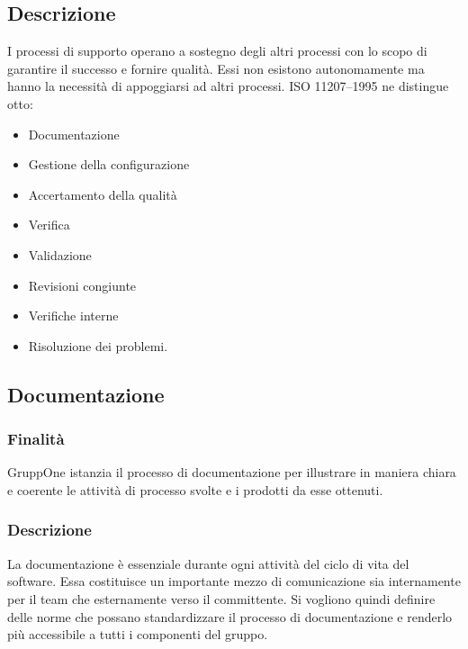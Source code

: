 \documentclass[../norme-di-progetto.tex]{subfiles}
\begin{document}
\subsection{Descrizione}%
\label{sub:processi_di_supporto/descrizione}

I processi di supporto operano a sostegno degli altri processi con lo scopo di garantire il successo e fornire qualità.
Essi non esistono autonomamente ma hanno la necessità di appoggiarsi ad altri processi.
ISO 11207--1995 ne distingue otto:

\begin{itemize}
  \item Documentazione
  \item Gestione della configurazione
  \item Accertamento della qualità
  \item Verifica
  \item Validazione
  \item Revisioni congiunte
  \item Verifiche interne
  \item Risoluzione dei problemi.
\end{itemize}

\subsection{Documentazione}%
\label{sub:documentazione}

\subsubsection{Finalità}%
\label{subs:documentazione/finalita}

GruppOne istanzia il processo di documentazione per illustrare in maniera chiara e coerente le attività di processo svolte e i prodotti da esse ottenuti.

\subsubsection{Descrizione}%
\label{subs:documentazione/descrizione}

La documentazione è essenziale durante ogni attività del ciclo di vita del software.
Essa costituisce un importante mezzo di comunicazione sia internamente per il team che esternamente verso il committente.
Si vogliono quindi definire delle norme che possano standardizzare il processo di documentazione e renderlo più accessibile a tutti i componenti del gruppo.
\end{document}
